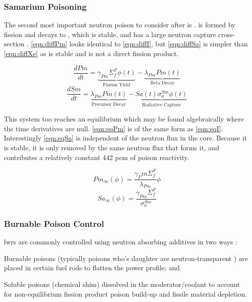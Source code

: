 \subsubsection{Samarium Poisoning}
The second most important neutron poison to consider after \Xe is \Sm. \Pm is formed by fission and decays to \Sm, which is stable, and has a large neutron capture cross-section \cite[Ch. 7]{Lamarsh}. \ref{eqn:diffPm} looks identical to \ref{eqn:diffI}, but \ref{eqn:diffSa} is simpler than \ref{eqn:diffXe} as \Sm is stable and is not a direct fission product.

\begin{equation}\label{eqn:diffPm}
    \frac{dPm}{dt} =
    \underbrace{\gamma_{Pm}\Sigma_{f}^{F}{\phi}(t)}_{\text{Fission Yield}}
    -\underbrace{\lambda_{Pm}Pm(t)}_{\text{Beta Decay}}
\end{equation}
\begin{equation}\label{eqn:diffSa}
        \frac{dSm}{dt} =
        \underbrace{\lambda_{Pm}Pm(t)}_{\text{Precursor Decay}}
        -
        \underbrace{Sa(t)\sigma_{a}^{Sm}{\phi}(t)}_{\text{Radiative Capture}}
\end{equation}

This system too reaches an equilibrium which may be found algebraically where the time derivatives are null. \ref{eqn:eqPm} is of the same form as \ref{eqn:eqI}. Interestingly \ref{eqn:eqSa} is independent of the neutron flux in the core. Because it is stable, it is only removed by the same neutron flux that forms it, and contributes a relatively constant 442 pcm of poison reactivity. 

\begin{equation}\label{eqn:eqPm}
    Pm_{\infty}(\phi) = \frac{\gamma_Pm \Sigma_f^F }{\lambda_{Pm}}\phi
\end{equation}
\begin{equation}\label{eqn:eqSa}
    Sa_{\infty}(\phi) = \frac{\gamma_{Pm} \Sigma_f^F }{\sigma_a^{Sm}}
\end{equation}

\subsubsection{Burnable Poison Control}
\acsp{lwr} are commonly controlled using neutron absorbing additives in two ways \cite[Ch. 8]{Kerlin}:
\begin{enumerate*}
    \item Burnable poisons (typically poisons who's daughter are neutron-transparent \cite[Ch. 14]{DH}) are placed in certain fuel rods to flatten the power profile; and 
    \item Soluble poisons (\ie chemical shim) dissolved in the moderator/coolant to account for non-equilibrium fission product poison build-up and fissile material depletion.
\end{enumerate*}

